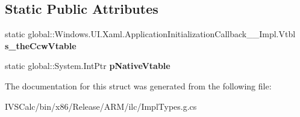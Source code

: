 \subsection*{Static Public Attributes}
\begin{DoxyCompactItemize}
\item 
\mbox{\label{struct_windows_1_1_u_i_1_1_xaml_1_1_application_initialization_callback_____impl_1_1_vtbl_aa6170a25ba1568e2864d74a678a42d68}} 
static global\+::\+Windows.\+U\+I.\+Xaml.\+Application\+Initialization\+Callback\+\_\+\+\_\+\+Impl.\+Vtbl {\bfseries s\+\_\+the\+Ccw\+Vtable}
\item 
\mbox{\label{struct_windows_1_1_u_i_1_1_xaml_1_1_application_initialization_callback_____impl_1_1_vtbl_affde648f5e1b7797a0d7b86d7a7e1879}} 
static global\+::\+System.\+Int\+Ptr {\bfseries p\+Native\+Vtable}
\end{DoxyCompactItemize}


The documentation for this struct was generated from the following file\+:\begin{DoxyCompactItemize}
\item 
I\+V\+S\+Calc/bin/x86/\+Release/\+A\+R\+M/ilc/Impl\+Types.\+g.\+cs\end{DoxyCompactItemize}
